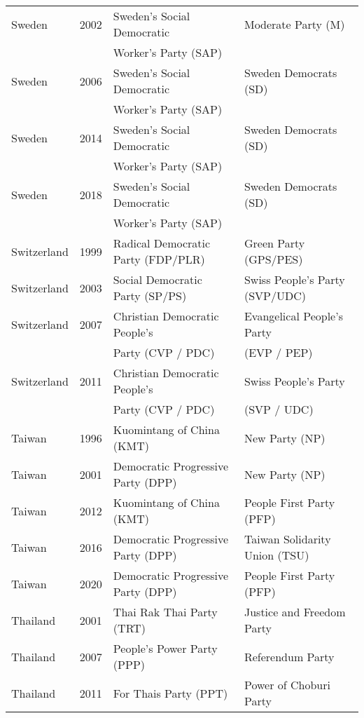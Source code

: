 {\begin{longtable}{|l|c|l|l|}
   Sweden & 2002 &   Sweden's   Social Democratic  &   Moderate Party (M) \\ 
               &      &      Worker's Party (SAP)  &     \\ 
   Sweden & 2006 &   Sweden's   Social Democratic  &   Sweden Democrats (SD) \\ 
               &      &   Worker's Party (SAP)     &     \\ 
   Sweden & 2014 &   Sweden's   Social Democratic  &   Sweden Democrats (SD) \\ 
               &      &   Worker's Party (SAP)     &     \\ 
   Sweden & 2018 &   Sweden's   Social Democratic  &   Sweden Democrats (SD) \\ 
               &      &     Worker's Party (SAP)   &     \\ 
   Switzerland & 1999 &   Radical Democratic Party (FDP/PLR) &   Green Party (GPS/PES) \\ 
   Switzerland & 2003 &        Social Democratic Party (SP/PS)  &   Swiss People's Party  (SVP/UDC)  \\ 
   Switzerland & 2007 &   Christian Democratic People's  &   Evangelical People's Party  \\ 
               &      &        Party (CVP / PDC) &    (EVP / PEP) \\ 
   Switzerland & 2011 &   Christian Democratic People's  &   Swiss People's Party \\ 
               &      &       Party (CVP / PDC)  &     (SVP / UDC) \\ 
   Taiwan & 1996 &   Kuomintang of China (KMT)  &   New Party (NP)   \\ 
   Taiwan & 2001 &   Democratic Progressive Party (DPP) &   New Party (NP)   \\ 
  Taiwan & 2012 &   Kuomintang of China (KMT)  &   People First Party (PFP)   \\ 
  Taiwan & 2016 &   Democratic Progressive Party (DPP) &   Taiwan Solidarity Union (TSU) \\ 
  Taiwan & 2020 &   Democratic Progressive Party (DPP) &   People First Party (PFP)   \\ 
  Thailand & 2001 &   Thai Rak Thai Party (TRT) &   Justice and Freedom Party \\ 
  Thailand & 2007 &   People's Power Party (PPP) &   Referendum Party  \\ 
  Thailand & 2011 &   For Thais Party (PPT) &   Power of Choburi Party \\ 

\end{longtable}}
